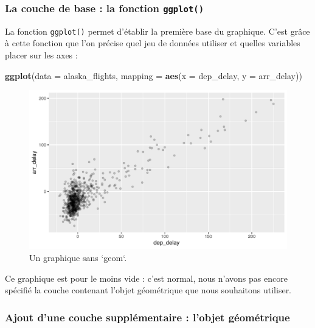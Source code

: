 \documentclass[
  a4paper,
]{article}
\newenvironment{Shaded}{\begin{snugshade}}{\end{snugshade}}
\newcommand{\DataTypeTok}[1]{\textcolor[rgb]{0.00,0.34,0.68}{#1}}
\newcommand{\KeywordTok}[1]{\textcolor[rgb]{0.12,0.11,0.11}{\textbf{#1}}}
\newcommand{\NormalTok}[1]{\textcolor[rgb]{0.12,0.11,0.11}{#1}}
\begin{document}
\hypertarget{la-couche-de-base-la-fonction-ggplot}{%
\subsubsection{\texorpdfstring{La couche de base : la fonction \texttt{ggplot()}}{La couche de base : la fonction ggplot()}}\label{la-couche-de-base-la-fonction-ggplot}}

La fonction \texttt{ggplot()} permet d'établir la première base du graphique. C'est grâce à cette fonction que l'on précise quel jeu de données utiliser et quelles variables placer sur les axes :

\begin{Shaded}
\begin{Highlighting}[]
\KeywordTok{ggplot}\NormalTok{(}\DataTypeTok{data =}\NormalTok{ alaska_flights, }\DataTypeTok{mapping =} \KeywordTok{aes}\NormalTok{(}\DataTypeTok{x =}\NormalTok{ dep_delay, }\DataTypeTok{y =}\NormalTok{ arr_delay))}
\end{Highlighting}
\end{Shaded}

\begin{figure}[htpb]

{\centering \includegraphics[width=0.9\linewidth]{figure/unnamed-chunk-40-1} 

}

\caption{Un graphique sans `geom`.}\label{fig:unnamed-chunk-40}
\end{figure}

Ce graphique est pour le moins vide : c'est normal, nous n'avons pas encore spécifié la couche contenant l'objet géométrique que nous souhaitons utiliser.

\hypertarget{ajout-dune-couche-suppluxe9mentaire-lobjet-guxe9omuxe9trique}{%
\subsubsection{Ajout d'une couche supplémentaire : l'objet géométrique}\label{ajout-dune-couche-suppluxe9mentaire-lobjet-guxe9omuxe9trique}}
\end{document}
